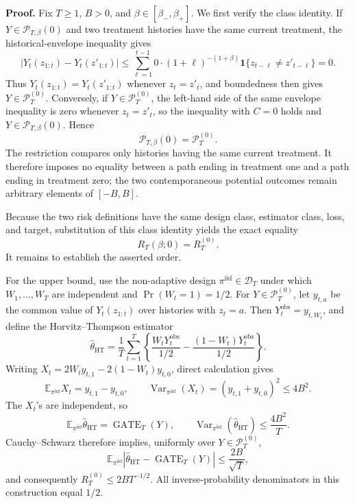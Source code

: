 \textbf{Proof.} Fix \(T\ge 1\), \(B>0\), and \(\beta\in[\beta_-,\beta_+]\). We first verify the class identity. If \(Y\in\mathcal P_{T,\beta}(0)\) and two treatment histories have the same current treatment, the historical-envelope inequality gives
\[
\left|Y_t(z_{1:t})-Y_t(z'_{1:t})\right|
\le \sum_{\ell=1}^{t-1}0\cdot(1+\ell)^{-(1+\beta)}\mathbf 1\{z_{t-\ell}\ne z'_{t-\ell}\}=0.
\]
Thus \(Y_t(z_{1:t})=Y_t(z'_{1:t})\) whenever \(z_t=z'_t\), and boundedness then gives \(Y\in\mathcal P_T^{(0)}\). Conversely, if \(Y\in\mathcal P_T^{(0)}\), the left-hand side of the same envelope inequality is zero whenever \(z_t=z'_t\), so the inequality with \(C=0\) holds and \(Y\in\mathcal P_{T,\beta}(0)\). Hence
\[
\mathcal P_{T,\beta}(0)=\mathcal P_T^{(0)}.
\]
The restriction compares only histories having the same current treatment. It therefore imposes no equality between a path ending in treatment one and a path ending in treatment zero; the two contemporaneous potential outcomes remain arbitrary elements of \([-B,B]\).

Because the two risk definitions have the same design class, estimator class, loss, and target, substitution of this class identity yields the exact equality
\[
R_T(\beta;0)=R_T^{(0)}.
\]
It remains to establish the asserted order.

For the upper bound, use the non-adaptive design \(\pi^{\mathrm{iid}}\in\mathcal D_T\) under which \(W_1,\ldots,W_T\) are independent and \(\Pr(W_t=1)=1/2\). For \(Y\in\mathcal P_T^{(0)}\), let \(y_{t,a}\) be the common value of \(Y_t(z_{1:t})\) over histories with \(z_t=a\). Then \(Y_t^{\mathrm{obs}}=y_{t,W_t}\), and define the Horvitz--Thompson estimator
\[
\widehat\theta_{\mathrm{HT}}
=\frac1T\sum_{t=1}^T\left\{\frac{W_tY_t^{\mathrm{obs}}}{1/2}-\frac{(1-W_t)Y_t^{\mathrm{obs}}}{1/2}\right\}.
\]
Writing \(X_t=2W_ty_{t,1}-2(1-W_t)y_{t,0}\), direct calculation gives
\[
\mathbb E_{\pi^{\mathrm{iid}}}X_t=y_{t,1}-y_{t,0},
\qquad
\operatorname{Var}_{\pi^{\mathrm{iid}}}(X_t)=(y_{t,1}+y_{t,0})^2\le 4B^2.
\]
The \(X_t\)'s are independent, so
\[
\mathbb E_{\pi^{\mathrm{iid}}}\widehat\theta_{\mathrm{HT}}
=\operatorname{GATE}_T(Y),
\qquad
\operatorname{Var}_{\pi^{\mathrm{iid}}}(\widehat\theta_{\mathrm{HT}})\le\frac{4B^2}{T}.
\]
Cauchy--Schwarz therefore implies, uniformly over \(Y\in\mathcal P_T^{(0)}\),
\[
\mathbb E_{\pi^{\mathrm{iid}}}\left|\widehat\theta_{\mathrm{HT}}-\operatorname{GATE}_T(Y)\right|
\le \frac{2B}{\sqrt T},
\]
and consequently \(R_T^{(0)}\le 2B T^{-1/2}\). All inverse-probability denominators in this construction equal \(1/2\).

